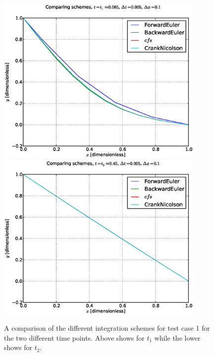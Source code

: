 \begin{figure}[htbp]
    \centering
    \includegraphics[width=0.9\textwidth]{plots/schemes_case1_t1.eps}
    \includegraphics[width=0.9\textwidth]{plots/schemes_case1_t2.eps}
    \caption{A comparison of the different integration schemes for
    test case 1 for the two different time points. Above shows for
    $t_1$ while the lower shows for $t_2$.}
    \label{fig:case1}
\end{figure}

